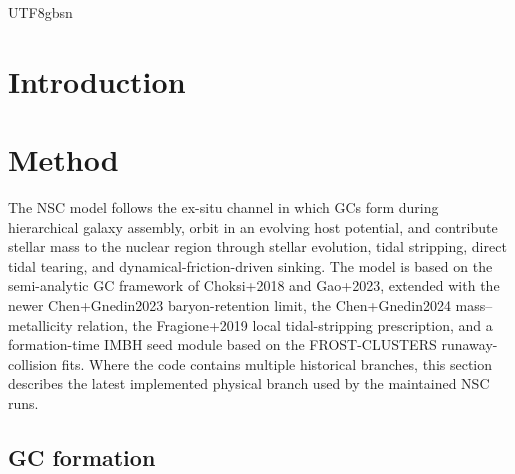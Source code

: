\documentclass[trackchanges, twocolappendix, twocolumn]{aastex701}
\begin{document}
\begin{CJK*}{UTF8}{gbsn}

\section{Introduction} \label{sect:intro}

\section{Method} \label{sect:method}

The NSC model follows the ex-situ channel in which GCs form during hierarchical galaxy assembly, orbit in an evolving host potential, and contribute stellar mass to the nuclear region through stellar evolution, tidal stripping, direct tidal tearing, and dynamical-friction-driven sinking. The model is based on the semi-analytic GC framework of Choksi+2018 and Gao+2023, extended with the newer Chen+Gnedin2023 baryon-retention limit, the Chen+Gnedin2024 mass--metallicity relation, the Fragione+2019 local tidal-stripping prescription, and a formation-time IMBH seed module based on the FROST-CLUSTERS runaway-collision fits. Where the code contains multiple historical branches, this section describes the latest implemented physical branch used by the maintained NSC runs.

\subsection{GC formation} \label{subsect:gc_formation}


\end{CJK*}
\end{document}
